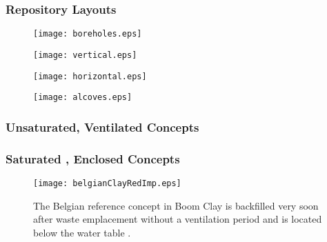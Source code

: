 \begin{frame}
  \frametitle{Repository Layouts}

  \begin{minipage}{0.49\textwidth}
    \begin{figure}[h!]
      \texttt{[image: boreholes.eps]}
    \end{figure}
    \begin{figure}[h!]
      \texttt{[image: vertical.eps]}
    \end{figure}
  \end{minipage}
  \hspace{0.01cm}
  \begin{minipage}{0.49\textwidth}
    \begin{figure}[h!]
      \texttt{[image: horizontal.eps]}
    \end{figure}
    \begin{figure}[h!]
      \texttt{[image: alcoves.eps]}
    \end{figure}
  \end{minipage}

\end{frame}

\begin{frame}
  \footnotesize{
  \frametitle{Unsaturated, Ventilated Concepts}
  
}
\end{frame}

\begin{frame}
  \footnotesize{
  \frametitle{Saturated , Enclosed Concepts} 
 \begin{figure}[h!]
    \begin{center}
      \texttt{[image: belgianClayRedImp.eps]}
    \end{center}
    \caption{The Belgian reference concept in Boom Clay is backfilled very soon
   after waste emplacement without a ventilation period and is located below the water table
   \cite{von_lensa_red-impact_2008}.}
    \label{fig:belgianClayRedImp}
  \end{figure}
}
\end{frame}
